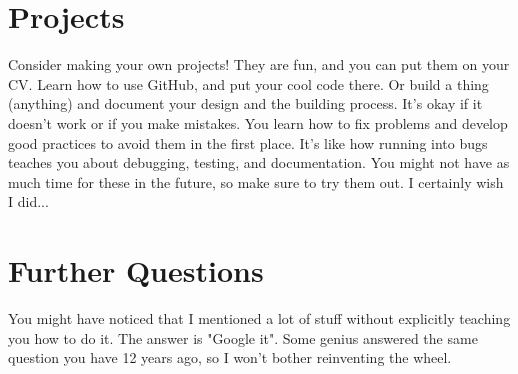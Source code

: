 \section{Projects}

Consider making your own projects! They are fun, and you can put them on your CV. Learn how to use GitHub, and put your cool code there. Or build a thing (anything) and document your design and the building process. It's okay if it doesn't work or if you make mistakes. You learn how to fix problems and develop good practices to avoid them in the first place. It's like how running into bugs teaches you about debugging, testing, and documentation. You might not have as much time for these in the future, so make sure to try them out. I certainly wish I did...

\section{Further Questions}

You might have noticed that I mentioned a lot of stuff without explicitly teaching you how to do it. The answer is "Google it". Some genius answered the same question you have 12 years ago, so I won't bother reinventing the wheel.
